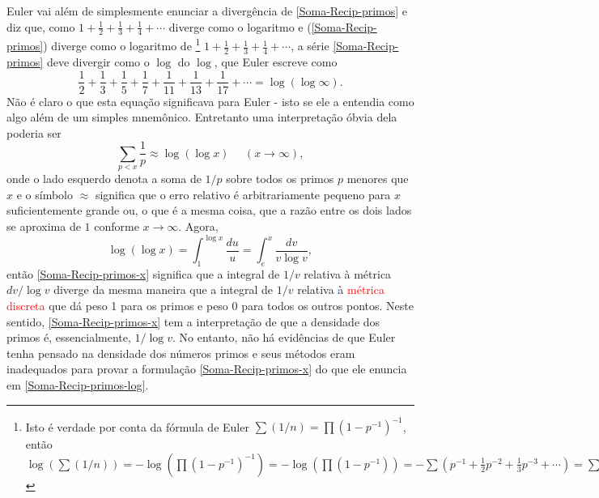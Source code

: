     Euler vai além de simplesmente enunciar a divergência de
    \eqref{Soma-Recip-primos} e diz que, como 
    $1 + \frac{1}{2} + \frac{1}{3} + \frac{1}{4} + \cdots$ 
    diverge como o logaritmo e 
    (\ref{Soma-Recip-primos}) diverge como o logaritmo de
    \footnote
    {Isto é verdade por conta da fórmula de Euler $\sum(1/n) = \prod (1-p^{-1})^{-1}$, então $\log (\sum(1/n)) = - \log(\prod(1-p^{-1})^{-1}) = -\log(\prod(1-p^{-1})) = -\sum (p^{-1} + \frac{1}{2}p^{-2} + \frac{1}{3}p^{-3} + \cdots ) = \sum(1/p) + \text{ convergente}.$}
    $1 + \frac{1}{2} + \frac{1}{3} + \frac{1}{4} + \cdots$, a série \eqref{Soma-Recip-primos} deve divergir como o $\log$ do $\log$, que Euler escreve como 
    \begin{equation}
    \label{Soma-Recip-primos-log}
    \frac{1}{2} + \frac{1}{3} + \frac{1}{5} + \frac{1}{7} + \frac{1}{11} + \frac{1}{13} + \frac{1}{17} + \cdots = \log(\log \infty).
    \end{equation}
    Não é claro o que esta equação significava para Euler - isto se ele a entendia como algo além de um simples mnemônico. Entretanto uma interpretação óbvia dela poderia ser
    \begin{equation}
    \label{Soma-Recip-primos-x}
    \sum_{p<x}\frac{1}{p} \approx \log(\log x) \ \ \ \ \ \ (x \to \infty),
    \end{equation}
    onde o lado esquerdo denota a soma de $1/p$ sobre todos os primos $p$ menores que $x$ e o símbolo $\approx$ significa que o erro relativo é arbitrariamente pequeno para $x$ suficientemente grande ou, o que é a mesma coisa, que a razão entre os dois lados se aproxima de $1$ conforme $x \to \infty$. Agora,
    $$\log(\log x) = \int_{1}^{\log x} \frac{du}{u} = \int_{e}^{x} \frac{dv}{v\log v},$$
    então \eqref{Soma-Recip-primos-x} significa que a integral de $1/v$ relativa à métrica $dv/\log v$ diverge da mesma maneira que a integral de $1/v$ relativa à \textcolor{red}{métrica discreta} que dá peso 1 para os primos e peso 0 para todos os outros pontos. Neste sentido, \eqref{Soma-Recip-primos-x} tem a interpretação de que a densidade dos primos é, essencialmente, $1/\log v$. No entanto, não há evidências de que Euler tenha pensado na densidade dos números primos e seus métodos eram inadequados para provar a formulação \eqref{Soma-Recip-primos-x} do que ele enuncia em \eqref{Soma-Recip-primos-log}.
    
